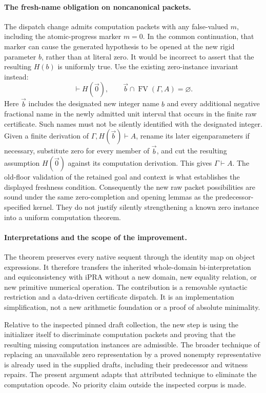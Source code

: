 \paragraph{The fresh-name obligation on noncanonical packets.}
The dispatch change admits computation packets with any false-valued
$m$, including the atomic-progress marker $m=0$.  In the common
continuation, that marker can cause the generated hypothesis to be
opened at the new rigid parameter $b$, rather than at literal zero.
It would be incorrect to assert that the resulting $H(b)$ is uniformly
true.  Use the existing zero-instance invariant instead:
\[
        \vdash H(\vec0),\qquad
        \vec b\cap\operatorname{FV}(\Gamma,A)=\varnothing.
\]
Here $\vec b$ includes the designated new integer name $b$ and every
additional negative fractional name in the newly admitted unit interval
that occurs in the finite raw certificate.  Such names must not be
silently identified with the designated integer.  Given a finite
derivation of $\Gamma,H(\vec b)\vdash A$, rename its later
eigenparameters if necessary, substitute zero for every member of
$\vec b$, and cut the resulting assumption $H(\vec0)$ against its
computation derivation.  This
gives $\Gamma\vdash A$.  The old-floor validation of the retained goal
and context is what establishes the displayed freshness condition.
Consequently the new raw packet possibilities are sound under the same
zero-completion and opening lemmas as the predecessor-specified kernel.
They do not justify silently strengthening a known zero instance into
a uniform computation theorem.

\paragraph{Interpretations and the scope of the improvement.}
The theorem preserves every native sequent through the identity map on
object expressions.  It therefore transfers the inherited whole-domain
bi-interpretation and equiconsistency with iPRA without a new domain,
new equality relation, or new primitive numerical operation.  The
contribution is a removable syntactic restriction and a data-driven
certificate dispatch.  It is an implementation simplification, not a
new arithmetic foundation or a proof of absolute minimality.

Relative to the inspected pinned draft collection, the new step is
using the initializer itself to discriminate computation packets and
proving that the resulting missing computation instances are admissible.
The broader technique of replacing an unavailable zero representation
by a proved nonempty representative is already used in the supplied
drafts, including their predecessor and witness repairs.  The present
argument adapts that attributed technique to eliminate the computation
opcode.  No priority claim outside the inspected corpus is made.
